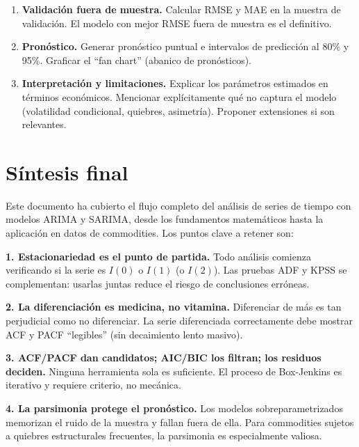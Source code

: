 \documentclass[12pt,a4paper]{article}
\theoremstyle{definition}
\begin{document}
\begin{defbox}
\begin{enumerate}
  \item[$\square$] \textbf{Validación fuera de muestra.}
    Calcular RMSE y MAE en la muestra de validación.
    El modelo con mejor RMSE fuera de muestra es el definitivo.

  \item[$\square$] \textbf{Pronóstico.}
    Generar pronóstico puntual e intervalos de predicción al 80\% y 95\%.
    Graficar el ``fan chart'' (abanico de pronósticos).

  \item[$\square$] \textbf{Interpretación y limitaciones.}
    Explicar los parámetros estimados en términos económicos.
    Mencionar explícitamente qué no captura el modelo (volatilidad condicional,
    quiebres, asimetría). Proponer extensiones si son relevantes.
\end{enumerate}
\end{defbox}

\section{Síntesis final}

Este documento ha cubierto el flujo completo del análisis de series de tiempo
con modelos ARIMA y SARIMA, desde los fundamentos matemáticos hasta la
aplicación en datos de commodities. Los puntos clave a retener son:

\medskip
\noindent\textbf{1. Estacionariedad es el punto de partida.}  Todo análisis
comienza verificando si la serie es $I(0)$ o $I(1)$ (o $I(2)$). Las pruebas
ADF y KPSS se complementan: usarlas juntas reduce el riesgo de conclusiones
erróneas.

\medskip
\noindent\textbf{2. La diferenciación es medicina, no vitamina.}  Diferenciar
de más es tan perjudicial como no diferenciar. La serie diferenciada correctamente
debe mostrar ACF y PACF ``legibles'' (sin decaimiento lento masivo).

\medskip
\noindent\textbf{3. ACF/PACF dan candidatos; AIC/BIC los filtran;
los residuos deciden.}  Ninguna herramienta sola es suficiente. El proceso de
Box-Jenkins es iterativo y requiere criterio, no mecánica.

\medskip
\noindent\textbf{4. La parsimonia protege el pronóstico.}  Los modelos
sobreparametrizados memorizan el ruido de la muestra y fallan fuera de ella.
Para commodities sujetos a quiebres estructurales frecuentes, la parsimonia
es especialmente valiosa.
\end{document}
